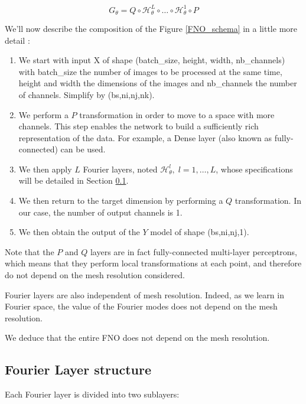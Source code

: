 \begin{equation*}
	G_\theta = Q \circ \mathcal{H}_\theta^L \circ \dots \circ \mathcal{H}_\theta^1 \circ P
\end{equation*}

We'll now describe the composition of the Figure \ref{FNO_schema} in a little more detail :
\begin{enumerate}[label=\textbullet]
	\item We start with input X of shape (batch\_size, height, width, nb\_channels) with batch\_size the number of images to be processed at the same time, height and width the dimensions of the images and nb\_channels the number of channels. Simplify by (bs,ni,nj,nk).
	\item We perform a $P$ transformation in order to move to a space with more channels. This step enables the network to build a sufficiently rich representation of the data.  For example, a Dense layer (also known as fully-connected) can be used. 	
	\item We then apply $L$ Fourier layers, noted $\mathcal{H}_\theta^l,\; l=1,\dots,L$, whose specifications will be detailed in Section \ref{FNO.fourierlayer}.
	\item We then return to the target dimension by performing a $Q$ transformation. In our case, the number of output channels is 1.
	\item We then obtain the output of the $Y$ model of shape (bs,ni,nj,1). 
\end{enumerate}

\begin{Rem}
	Note that the $P$ and $Q$ layers are in fact fully-connected multi-layer perceptrons, which means that they perform local transformations at each point, and therefore do not depend on the mesh resolution considered.
	
	Fourier layers are also independent of mesh resolution. Indeed, as we learn in Fourier space, the value of the Fourier modes does not depend on the mesh resolution.
	
	We deduce that the entire FNO does not depend on the mesh resolution.
\end{Rem}

\subsection{Fourier Layer structure} \label{FNO.fourierlayer}

Each Fourier layer is divided into two sublayers:


